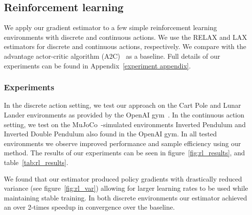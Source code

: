 \documentclass{article}
\newcommand{\LAX}{{\textnormal{LAX}}}
\newcommand{\RELAX}{{\textnormal{RELAX}}}
\begin{document}
\subsection{Reinforcement learning}
We apply our gradient estimator to a few simple reinforcement learning environments with discrete and continuous actions.
We use the \RELAX{} and \LAX{} estimators for discrete and continuous actions, respectively.
We compare with the advantage actor-critic algorithm (A2C)~\citep{sutton2000policy} as a baseline.
Full details of our experiments can be found in Appendix~\ref{experiment appendix}.



\subsubsection{Experiments}
\label{experiments section}
In the discrete action setting, we test our approach on the Cart Pole and Lunar Lander environments as provided by the OpenAI gym~\citep{1606.01540}.
In the continuous action setting, we test on the MuJoCo~\citep{todorov2012mujoco}-simulated environments Inverted Pendulum and Inverted Double Pendulum also found in the OpenAI gym.
In all tested environments we observe improved performance and sample efficiency using our method.
The results of our experiments can be seen in figure~\ref{fig:rl_results}, and table~\ref{tab:rl_results}.

We found that our estimator produced policy gradients with drastically reduced variance (see figure~\ref{fig:rl_var}) allowing for larger learning rates to be used while maintaining stable training.
In both discrete environments our estimator achieved an over 2-times speedup in convergence over the baseline.
\end{document}
